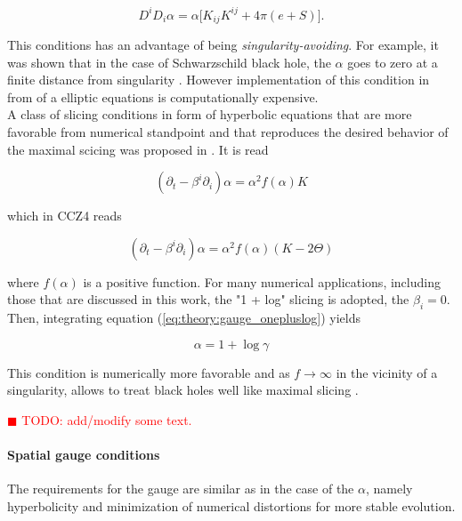\documentclass[11pt,a4paper,headinclude=true,DIV=14,BCOR=8mm,chapterprefix,listof=totoc,twoside,openright,abstracton]{scrbook}
\newcommand{\todo}[1]{\textcolor{red}{$\blacksquare$ TODO: #1}}
\begin{document}
\begin{equation}
    D^{i}D_{i}\alpha = \alpha\big[K_{ij}K^{ij} + 4\pi(e+S)\big].
\end{equation}

This conditions has an advantage of being \textit{singularity-avoiding}. For example, it was shown that in the case of Schwarzschild black hole, the $\alpha$ goes to zero at a finite distance from singularity \cite{Geyer:1995}. However implementation of this condition in from of a elliptic equations is computationally expensive.   \\
A class of slicing conditions in form of hyperbolic equations that are more favorable from numerical standpoint and that reproduces the desired behavior of the maximal scicing was proposed in \cite{Bona:1994dr}. It is read 

\begin{equation}
(\partial_t - \beta^i\partial_i)\alpha = \alpha^2 f(\alpha)K
\label{eq:theory:gauge_onepluslog}
\end{equation}

which in CCZ4 reads 

\begin{equation}
    (\partial_t - \beta^i \partial_i )\alpha = \alpha^2 f(\alpha)(K-2\Theta)
\end{equation}

where $f(\alpha)$ is a positive function. For many numerical applications, including those that are discussed in this work, the "1 + log" slicing is adopted, the $\beta_i=0$. Then, integrating equation (\ref{eq:theory:gauge_onepluslog}) yields 

\begin{equation}
    \alpha = 1 + \log\gamma
\end{equation}

This condition is numerically more favorable and as $f\rightarrow\infty$ in the vicinity of a singularity, allows to treat black holes well like maximal slicing \cite{Baumgarte:2002jm}.

\todo{add/modify some text.}

\paragraph{Spatial gauge conditions}

The requirements for the gauge are similar as in the case of the $\alpha$, namely hyperbolicity and minimization of numerical distortions for more stable evolution.  
\end{document}

